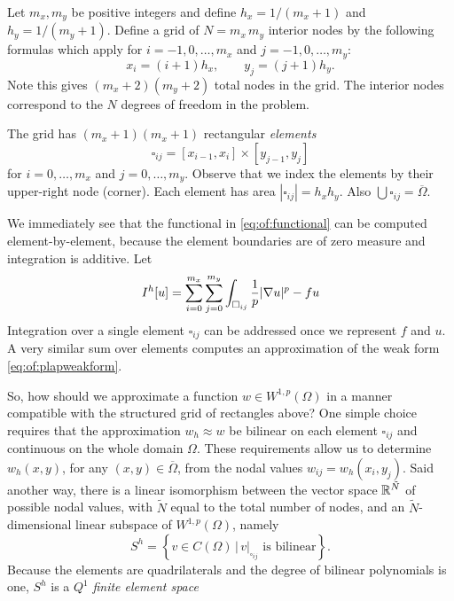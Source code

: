 Let $m_x,m_y$ be positive integers and define $h_x = 1/(m_x+1)$ and $h_y = 1/(m_y+1)$.  Define a grid of $N=m_x\, m_y$ interior nodes by the following formulas which apply for $i=-1,0,\dots,m_x$ and $j=-1,0,\dots,m_y$:
\begin{equation}
x_i = (i+1) h_x, \qquad y_j = (j+1) h_y. \label{eq:of:structuredgridindexing}
\end{equation}
Note this gives $(m_x+2)(m_y+2)$ total nodes in the grid.  The interior nodes correspond to the $N$ degrees of freedom in the problem.

The grid has $(m_x+1)(m_x+1)$ rectangular \emph{elements}
   $$\square_{ij} = [x_{i-1},x_i] \times [y_{j-1},y_j]$$
for $i=0,\dots,m_x$ and $j=0,\dots,m_y$.  Observe that we index the elements by their upper-right node (corner).  Each element has area $|\square_{ij}| = h_x h_y$.  Also $\bigcup  \square_{ij} = \overline \Omega$.

We immediately see that the functional in \eqref{eq:of:functional} can be computed element-by-element, because the element boundaries are of zero measure and integration is additive.  Let
\begin{equation}
I^h[u] = \sum_{i=0}^{m_x} \sum_{j=0}^{m_y} \int_{\square_{ij}} \frac{1}{p} |\nabla u|^p - fu  \label{eq:of:sumoverelements}
\end{equation}
Integration over a single element $\square_{ij}$ can be addressed once we represent $f$ and $u$.  A very similar sum over elements computes an approximation of the weak form \eqref{eq:of:plapweakform}.

So, how should we approximate a function $w \in W^{1,p}(\Omega)$ in a manner compatible with the structured grid of rectangles above?  One simple choice requires that the approximation $w_h \approx w$ be bilinear on each element $\square_{ij}$ and continuous on the whole domain $\Omega$.  These requirements allow us to determine $w_h(x,y)$, for any $(x,y)\in \overline\Omega$, from the nodal values $w_{ij} = w_h(x_i,y_j)$.  Said another way, there is a linear isomorphism between the vector space $\mathbb{R}^{\tilde N}$ of possible nodal values, with $\tilde N$ equal to the total number of nodes, and an $\tilde N$-dimensional linear subspace of $W^{1,p}(\Omega)$, namely
\begin{equation}
S^h = \left\{v \in C(\Omega) \, \Big| \, v|_{\square_{ij}} \text{ is bilinear}\right\}. \label{eq:of:Shdefn}
\end{equation}
Because the elements are quadrilaterals and the degree of bilinear polynomials is one, $S^h$ is a $Q^1$ \emph{finite element space} \citep{Elmanetal2005}

